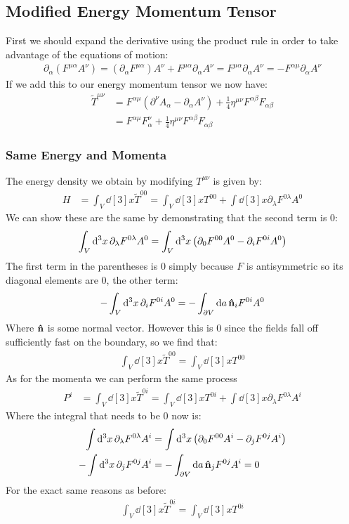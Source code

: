 \documentclass[12pt]{article}
\newcommand{\D}{\partial}
\begin{document}
\subsection{Modified Energy Momentum Tensor}
First we should expand the derivative using the product rule in order to take advantage of the equations of motion:
\begin{align*}
  \D_\alpha(F^{\mu\alpha}A^\nu)=(\D_\alpha F^{\mu\alpha})A^\nu+
  F^{\mu\alpha}\D_\alpha A^\nu=F^{\mu\alpha}\D_\alpha A^\nu=-F^{\alpha\mu}
  \D_\alpha A^\nu
\end{align*}
If we add this to our energy momentum tensor we now have:
\begin{align*}
  \tilde{T}^{\mu\nu}&=F^{\alpha\mu}(\D^\nu A_\alpha-\D_\alpha A^\nu)
  +\frac14\eta^{\mu\nu}F^{\alpha\beta}F_{\alpha\beta}\\
  &=F^{\alpha\mu}F^\nu_\alpha+\frac14\eta^{\mu\nu}F^{\alpha\beta}F_{\alpha\beta}
\end{align*}

\subsubsection{Same Energy and Momenta}
The energy density we obtain by modifying $T^{\mu\nu}$ is given by:
\begin{align*}
  H&=\int_V\dd[3]{x}\tilde{T}^{00}=\int_V\dd[3]{x}T^{00}
  +\int\dd[3]{x}\D_\lambda F^{0\lambda}A^0
\end{align*}
We can show these are the same by demonstrating that the second term is 0:
\begin{align*}
  \int_V\dd[3]{x}\D_\lambda F^{0\lambda}A^0=
  \int_V\dd[3]{x}\qty(\D_0 F^{00}A^0-\D_iF^{0i}A^0)
\end{align*}
The first term in the parentheses is 0 simply because $F$ is antisymmetric so its diagonal elements are $0$, the other term:
\begin{align*}
  -\int_{V}\dd[3]{x}\D_iF^{0i}A^0=-\int_{\D V}\dd{a}\vu{n}_iF^{0i}A^0
\end{align*}
Where $\vu{n}$ is some normal vector. However this is 0 since the fields fall off sufficiently fast on the boundary, so we find that:
\begin{align}
  \boxed{\int_V\dd[3]{x}\tilde{T}^{00}=\int_V\dd[3]{x}T^{00}}
\end{align}
As for the momenta we can perform the same process
\begin{align*}
  P^i&=\int_V\dd[3]{x}\tilde{T}^{0i}=\int_V\dd[3]{x}T^{0i}
  +\int\dd[3]{x}\D_\lambda F^{0\lambda}A^i
\end{align*}
Where the integral that needs to be $0$ now is:
\begin{align*}
  \int\dd[3]{x}\D_\lambda F^{0\lambda}A^i&=
  \int\dd[3]{x}\qty(\D_0F^{00}A^i-\D_jF^{0j}A^i)\\
  -\int\dd[3]{x}\D_jF^{0j}A^i&=-\int_{\D V}\dd{a}\vu{n}_jF^{0j}A^i=0
\end{align*}
For the exact same reasons as before:
\begin{align}
  \boxed{\int_V\dd[3]{x}\tilde{T}^{0i}=\int_V\dd[3]{x}T^{0i}}
\end{align}
\end{document}
